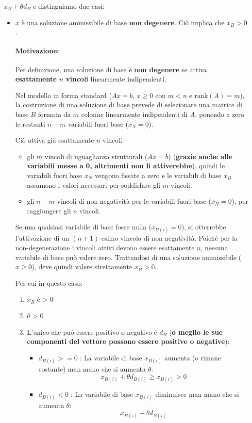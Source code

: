 $x_B + \theta d_B$ e distinguiamo due casi:
\begin{itemize}
\item[(a)] $x$ è una soluzione ammissibile di base \textbf{non degenere}. Ciò implica che $x_B > 0$.

\paragraph{Motivazione:}
Per definizione, una soluzione di base è \textbf{non degenere} se attiva \textbf{esattamente $n$ vincoli} linearmente indipendenti.

Nel modello in forma standard ($Ax = b, \, x \ge 0$ con $m < n$ e $\text{rank}(A) = m$), la costruzione di una soluzione di base prevede di selezionare una matrice di base $B$ formata da $m$ colonne linearmente indipendenti di $A$, ponendo a zero le restanti $n - m$ variabili fuori base ($x_N = 0$).

Ciò attiva già esattamente $n$ vincoli:
\begin{itemize}
    \item gli $m$ vincoli di uguaglianza strutturali ($Ax = b$) (\textbf{grazie anche alle variabili messe a 0, altrimenti non li attiverebbe}), quindi le variabili fuori base \(x_N\) vengono fissate a zero e le variabili di base \(x_B\) assumono i valori necessari per soddisfare gli \(m\) vincoli.
    \item gli $n - m$ vincoli di non-negatività per le variabili fuori base ($x_N = 0$), per raggiungere gli $n$ vincoli.
\end{itemize}

Se una qualsiasi variabile di base fosse nulla ($x_{B(i)} = 0$), si otterrebbe l'attivazione di un $(n+1)$-esimo vincolo di non-negatività. Poiché per la non-degenerazione i vincoli attivi devono essere esattamente $n$, nessuna variabile di base può valere zero. Trattandosi di una soluzione ammissibile ($x \ge 0$), deve quindi valere strettamente $x_B > 0$.

Per cui in questo caso:
\begin{enumerate}
    \item \textbf{$x_B$} è > 0
    \item $\theta$ > 0
    \item L'unico che può essere positivo o negativo è $d_B$ (\textbf{o meglio le sue componenti del vettore possono essere positive o negative}):
    \begin{itemize}
        \item \textbf{$d_{B(i)} >= 0$} : La variabile di base $x_{B(i)}$ aumenta (o rimane costante) man mano che si aumenta $\theta$:$$x_{B(i)} + \theta d_{B(i)} \ge x_{B(i)} > 0$$
        \item \textbf{$d_{B(i)} < 0$} : La variabile di base $x_{B(i)}$ diminuisce man mano che si aumenta $\theta$:$$x_{B(i)} + \theta d_{B(i)}$$   
    \end{itemize}
\end{enumerate}


\end{itemize}
